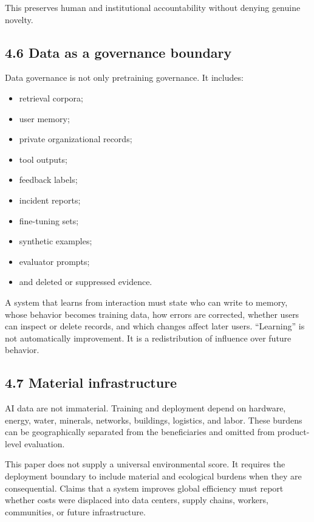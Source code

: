\documentclass[
  11pt,
]{article}
\providecommand{\tightlist}{%
  \setlength{\itemsep}{0pt}\setlength{\parskip}{0pt}}
\begin{document}
This preserves human and institutional accountability without denying
genuine novelty.

\subsection{4.6 Data as a governance
boundary}\label{data-as-a-governance-boundary}

Data governance is not only pretraining governance. It includes:

\begin{itemize}
\tightlist
\item
  retrieval corpora;
\item
  user memory;
\item
  private organizational records;
\item
  tool outputs;
\item
  feedback labels;
\item
  incident reports;
\item
  fine-tuning sets;
\item
  synthetic examples;
\item
  evaluator prompts;
\item
  and deleted or suppressed evidence.
\end{itemize}

A system that learns from interaction must state who can write to
memory, whose behavior becomes training data, how errors are corrected,
whether users can inspect or delete records, and which changes affect
later users. ``Learning'' is not automatically improvement. It is a
redistribution of influence over future behavior.

\subsection{4.7 Material infrastructure}\label{material-infrastructure}

AI data are not immaterial. Training and deployment depend on hardware,
energy, water, minerals, networks, buildings, logistics, and labor.
These burdens can be geographically separated from the beneficiaries and
omitted from product-level evaluation.

This paper does not supply a universal environmental score. It requires
the deployment boundary to include material and ecological burdens when
they are consequential. Claims that a system improves global efficiency
must report whether costs were displaced into data centers, supply
chains, workers, communities, or future infrastructure.
\end{document}

